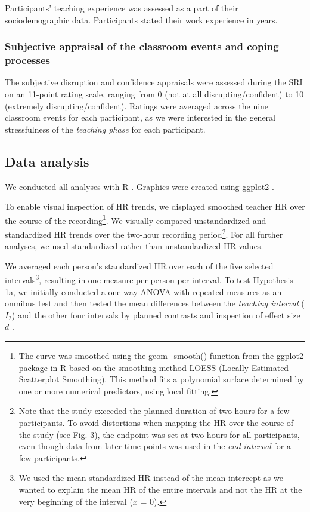 \documentclass[preprint, 3p,
authoryear]{elsarticle} %
\begin{document}
Participants' teaching experience was assessed as a part of their
sociodemographic data. Participants stated their work experience in
years.

\subsubsection{Subjective appraisal of the classroom events and coping
processes}\label{subjective-appraisal-of-the-classroom-events-and-coping-processes}

The subjective disruption and confidence appraisals were assessed during
the SRI on an 11-point rating scale, ranging from 0 (not at all
disrupting/confident) to 10 (extremely disrupting/confident). Ratings
were averaged across the nine classroom events for each participant, as
we were interested in the general stressfulness of the \emph{teaching
phase} for each participant.

\subsection{Data analysis}\label{data-analysis}

We conducted all analyses with R \citep{RStudio2020}. Graphics were
created using ggplot2 \citep{ggplot2}.

To enable visual inspection of HR trends, we displayed smoothed teacher
HR over the course of the recording\footnote{The curve was smoothed
  using the geom\_smooth() function from the ggplot2 package in R
  \citep{ggplot2} based on the smoothing method LOESS (Locally Estimated
  Scatterplot Smoothing). This method fits a polynomial surface
  determined by one or more numerical predictors, using local fitting.}.
We visually compared unstandardized and standardized HR trends over the
two-hour recording period\footnote{Note that the study exceeded the
  planned duration of two hours for a few participants. To avoid
  distortions when mapping the HR over the course of the study (see Fig.
  3), the endpoint was set at two hours for all participants, even
  though data from later time points was used in the \emph{end interval}
  for a few participants.}. For all further analyses, we used
standardized rather than unstandardized HR values.

We averaged each person's standardized HR over each of the five selected
intervals\footnote{We used the mean standardized HR instead of the mean
  intercept as we wanted to explain the mean HR of the entire intervals
  and not the HR at the very beginning of the interval (\(x\) = 0).},
resulting in one measure per person per interval. To test Hypothesis 1a,
we initially conducted a one-way ANOVA with repeated measures as an
omnibus test and then tested the mean differences between the
\emph{teaching interval} (\(I_2\)) and the other four intervals by
planned contrasts and inspection of effect size \(d\)
\citep{cohen1988statistical}.
\end{document}
